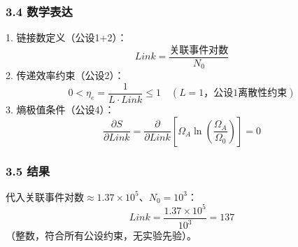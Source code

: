 \documentclass{article}
\begin{document}
\subsubsection{3.4 数学表达}
1. 链接数定义（公设1+2）：  
   \[
   Link = \frac{\text{关联事件对数}}{N_0}
   \]
2. 传递效率约束（公设2）：  
   \[
   0 < \eta_e = \frac{1}{L \cdot Link} \leq 1 \quad (L=1，公设1离散性约束)
   \]
3. 熵极值条件（公设4）：  
   \[
   \frac{\partial S}{\partial Link} = \frac{\partial}{\partial Link} \left[ \Omega_A \ln\left(\frac{\Omega_A}{\Omega_0}\right) \right] = 0
   \]

\subsubsection{3.5 结果}
代入关联事件对数\(\approx1.37 \times 10^5\)、\(N_0=10^3\)：  
\[
Link = \frac{1.37 \times 10^5}{10^3} = 137
\]
（整数，符合所有公设约束，无实验先验）。
\end{document}
